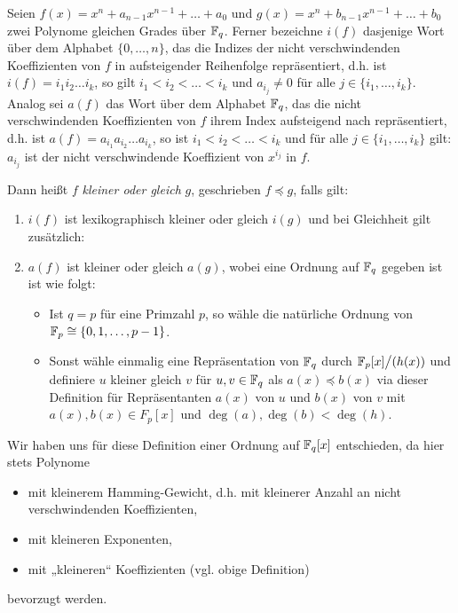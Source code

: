 \begin{definition}
  \label{def:polynomordnung}
  Seien $f(x) = x^n+a_{n-1}x^{n-1}+\ldots+a_0$ und
  $g(x) = x^n + b_{n-1}x^{n-1}+\ldots+b_0$ zwei Polynome gleichen Grades über 
  $\mathbb{F}_q$. Ferner bezeichne $i(f)$ dasjenige Wort über dem Alphabet
  $\{ 0,\ldots,n\}$, das die Indizes der nicht verschwindenden 
  Koeffizienten von $f$ in
  aufsteigender Reihenfolge repräsentiert, d.h. ist $i(f) = i_1i_2\ldots i_k$,
  so gilt $i_1<i_2<\ldots<i_k$ und $a_{i_j} \neq 0$ für alle 
  $j \in \{i_1,\ldots,i_k\}$. Analog sei $a(f)$ das Wort über dem Alphabet 
  $\mathbb{F}_q$, das die nicht verschwindenden Koeffizienten von $f$ 
  ihrem Index aufsteigend nach repräsentiert, d.h. ist 
  $a(f) = a_{i_1}a_{i_2}\ldots a_{i_k}$, so ist 
  $i_1<i_2<\ldots<i_k$ und für alle $j \in \{i_1,\ldots,i_k\}$ gilt:
  $a_{i_j}$ ist der nicht verschwindende Koeffizient
  von $x^{i_j}$ in $f$.

  Dann heißt $f$ \emph{kleiner oder gleich} $g$, 
  geschrieben $f\preceq g$, falls gilt:
  \begin{enumerate}
    \item $i(f)$ ist lexikographisch kleiner oder gleich $i(g)$ und bei
      Gleichheit gilt zusätzlich:
    \item $a(f)$ ist kleiner oder gleich $a(g)$, wobei eine Ordnung
      auf $\mathbb{F}_q$ gegeben ist ist wie folgt:
      \begin{itemize}
        \item Ist $q = p$ für eine Primzahl $p$, so wähle die natürliche Ordnung von
          $\mathbb{F}_p \cong \{ 0,1,\ldots,p-1\}$.
        \item Sonst wähle einmalig eine Repräsentation von 
          $\mathbb{F}_q$ durch $\mathbb{F}_p[x]\big/(h(x))$ und definiere 
          $u$ kleiner gleich $v$ für $u,v\in \mathbb{F}_q$ als
          $a(x) \preceq b(x)$ via dieser Definition für
          Repräsentanten $a(x)$ von $u$ und $b(x)$ von $v$ mit
          $a(x),b(x) \in F_p[x]$ und $\deg(a),\deg(b) < \deg(h)$.
      \end{itemize}
  \end{enumerate}
\end{definition}


Wir haben uns für diese Definition einer Ordnung auf $\mathbb{F}_q[x]$ entschieden, da
hier stets Polynome 
\begin{itemize}
  \item mit kleinerem Hamming-Gewicht, d.h. mit kleinerer Anzahl an 
    nicht verschwindenden Koeffizienten, 
  \item mit kleineren Exponenten,
  \item mit „kleineren“ Koeffizienten (vgl. obige Definition)
\end{itemize}
bevorzugt werden.


